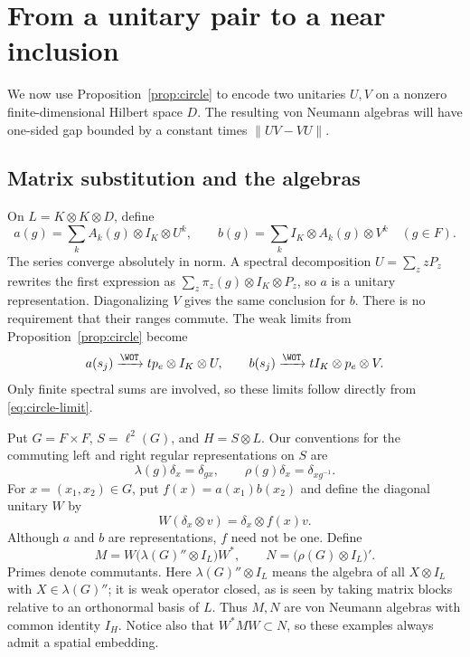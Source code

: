 \section{From a unitary pair to a near inclusion}\label{sec:near}

We now use Proposition~\ref{prop:circle} to encode two unitaries
$U,V$ on a nonzero finite-dimensional Hilbert space $D$. The resulting
von Neumann algebras will have one-sided gap bounded by a constant
times $\|UV-VU\|$.

\subsection{Matrix substitution and the algebras}
On $L=K\otimes K\otimes D$, define
\begin{equation}\label{eq:matrix-reps}
 a(g)=\sum_k A_k(g)\otimes I_K\otimes U^k,
 \qquad
 b(g)=\sum_k I_K\otimes A_k(g)\otimes V^k
 \quad(g\in F).
\end{equation}
The series converge absolutely in norm. A spectral decomposition
$U=\sum_z zP_z$ rewrites the first expression as
$\sum_z\pi_z(g)\otimes I_K\otimes P_z$, so $a$ is a unitary
representation. Diagonalizing $V$ gives the same conclusion for $b$.
There is no requirement that their ranges commute. The weak limits
from Proposition~\ref{prop:circle} become
\begin{equation}\label{eq:matrix-limits}
 a(s_j)\xrightarrow{\WOT}t p_e\otimes I_K\otimes U,
 \qquad
 b(s_j)\xrightarrow{\WOT}t I_K\otimes p_e\otimes V.
\end{equation}
Only finite spectral sums are involved, so these limits follow
directly from \eqref{eq:circle-limit}.

Put $G=F\times F$, $S=\ell^2(G)$, and $H=S\otimes L$.
Our conventions for the commuting left and right regular
representations on $S$ are
\[
 \lambda(g)\delta_x=\delta_{gx},\qquad
 \rho(g)\delta_x=\delta_{xg^{-1}}.
\]
For $x=(x_1,x_2)\in G$, put $f(x)=a(x_1)b(x_2)$ and define the
diagonal unitary $W$ by
\[
 W(\delta_x\otimes v)=\delta_x\otimes f(x)v.
\]
Although $a$ and $b$ are representations, $f$ need not be one.
Define
\begin{equation}\label{eq:algebras}
 M=W\bigl(\lambda(G)''\otimes I_L\bigr)W^*,
 \qquad N=\bigl(\rho(G)\otimes I_L\bigr)'.
\end{equation}
Primes denote commutants. Here $\lambda(G)''\otimes I_L$ means
the algebra of all $X\otimes I_L$ with $X\in\lambda(G)''$;
it is weak operator closed, as is seen by taking matrix blocks
relative to an orthonormal basis of $L$. Thus $M,N$ are von Neumann
algebras with common identity $I_H$. Notice also that
$W^*MW\subset N$, so these examples always admit a spatial embedding.

